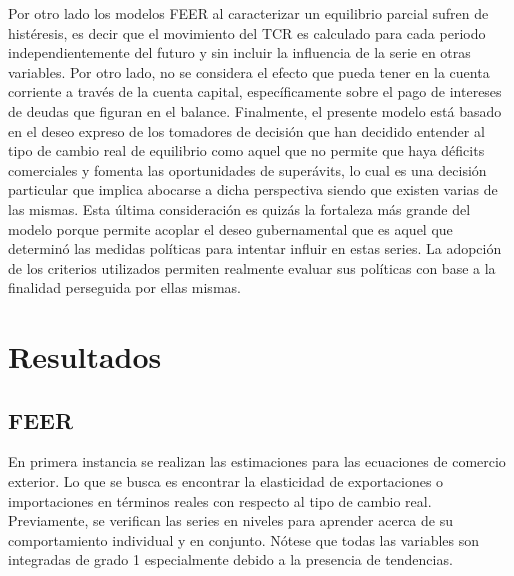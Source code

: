 \documentclass[12pt,letterpaper]{article}
\begin{document}
Por otro lado los modelos FEER al caracterizar un equilibrio parcial sufren de histéresis, es decir que el movimiento del TCR es calculado para cada periodo independientemente del futuro y sin incluir la influencia de la serie en otras variables. Por otro lado, no se considera el efecto que pueda tener en la cuenta corriente a través de la cuenta capital, específicamente sobre el pago de intereses de deudas que figuran en el balance. Finalmente, el presente modelo está basado en el deseo expreso de los tomadores de decisión que han decidido entender al tipo de cambio real de equilibrio como aquel que no permite que haya déficits comerciales y fomenta las oportunidades de superávits, lo cual es una decisión particular que implica abocarse a dicha perspectiva siendo que existen varias de las mismas. Esta última consideración es quizás la fortaleza más grande del modelo porque permite acoplar el deseo gubernamental que es aquel que determinó las medidas políticas para intentar influir en estas series. La adopción de los criterios utilizados permiten realmente evaluar sus políticas con base a la finalidad perseguida por ellas mismas.














\section{Resultados}\label{calc}
\subsection*{FEER}

En primera instancia se realizan las estimaciones para las ecuaciones de comercio exterior. Lo que se busca es encontrar la elasticidad de exportaciones o importaciones en términos reales con respecto al tipo de cambio real. Previamente, se verifican las series en niveles para aprender acerca de su comportamiento individual y en conjunto. Nótese que todas las variables son integradas de grado 1 especialmente debido a la presencia de tendencias.
\end{document}
